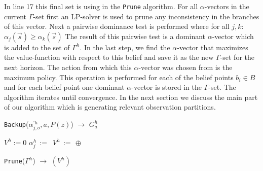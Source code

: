 \documentclass{article} %
\begin{document}
In line 17 this final set is using in the \texttt{Prune} algorithm. For all $\alpha$-vectors in the current $\Gamma$-set first an LP-solver is used to prune any inconsistency in the branches of this vector. Next a pairwise dominance test is performed where for all $j,k$: $\alpha_j(\vec{s}) \geq \alpha_k(\vec{s})$
The result of this pairwise test is a dominant $\alpha$-vector which is added to the set of $\Gamma^h$. 
In the last step, we find the $\alpha$-vector that maximizes the value-function with respect to this belief and save it as the new $\Gamma$-set for the next horizon. The action from which this $\alpha$-vector was chosen from is the maximum policy. 
This operation is performed for each of the belief points $b_i \in B$ and for each belief point one dominant $\alpha$-vector is stored in the $\Gamma$-set. The algorithm iterates until convergence. 
In the next section we discuss the main part of our algorithm which is generating relevant observation partitions.

\incmargin{.5em}
\linesnumbered
\begin{algorithm}[t!]
\vspace{-.5mm}
\dontprintsemicolon
{}
\caption{\footnotesize \texttt{Backup}($\alpha_{j,o}^{'h},a,P(z)$) $\longrightarrow$ $G_a^h$ \label{alg:regress}}
\vspace{-1mm}
\end{algorithm}
\decmargin{.5em}
\incmargin{.5em}
\linesnumbered
\begin{algorithm}[t!]
\vspace{-.5mm}
\Begin
{
   		$V^h :=0$ \;
       {
           $\alpha_j^h \,:=\,$ \;
           {
				{         
           			$V^h \,:=\,\oplus$  \; 
           		}  
           	}
       }
      \;
}
\caption{\footnotesize \texttt{Prune}($\Gamma^h$) $\longrightarrow$ $(V^h)$ }
\vspace{-1mm}
\end{algorithm}
\decmargin{.5em}
\end{document}
